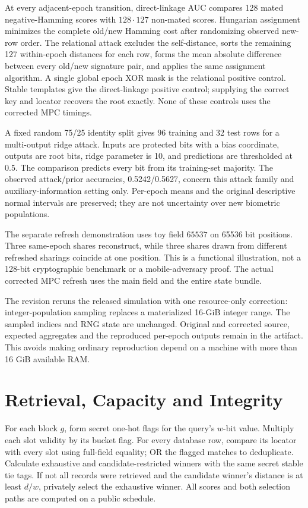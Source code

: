\documentclass[journal,onecolumn]{IEEEtran}
\begin{document}
At every adjacent-epoch transition, direct-linkage AUC compares 128 mated negative-Hamming scores with $128\cdot127$ non-mated scores. Hungarian assignment minimizes the complete old/new Hamming cost after randomizing observed new-row order. The relational attack excludes the self-distance, sorts the remaining 127 within-epoch distances for each row, forms the mean absolute difference between every old/new signature pair, and applies the same assignment algorithm. A single global epoch XOR mask is the relational positive control. Stable templates give the direct-linkage positive control; supplying the correct key and locator recovers the root exactly. None of these controls uses the corrected MPC timings.

A fixed random 75/25 identity split gives 96 training and 32 test rows for a multi-output ridge attack. Inputs are protected bits with a bias coordinate, outputs are root bits, ridge parameter is 10, and predictions are thresholded at 0.5. The comparison predicts every bit from its training-set majority. The observed attack/prior accuracies, 0.5242/0.5627, concern this attack family and auxiliary-information setting only. Per-epoch means and the original descriptive normal intervals are preserved; they are not uncertainty over new biometric populations.

The separate refresh demonstration uses toy field $65537$ on 65536 bit positions. Three same-epoch shares reconstruct, while three shares drawn from different refreshed sharings coincide at one position. This is a functional illustration, not a 128-bit cryptographic benchmark or a mobile-adversary proof. The actual corrected MPC refresh uses the main field and the entire state bundle.

The revision reruns the released simulation with one resource-only correction: integer-population sampling replaces a materialized 16-GiB integer range. The sampled indices and RNG state are unchanged. Original and corrected source, expected aggregates and the reproduced per-epoch outputs remain in the artifact. This avoids making ordinary reproduction depend on a machine with more than 16 GiB available RAM.

\section{Retrieval, Capacity and Integrity}\label{suppsec:supplement:5}
For each block $g$, form secret one-hot flags for the query's $w$-bit value. Multiply each slot validity by its bucket flag. For every database row, compare its locator with every slot using full-field equality; OR the flagged matches to deduplicate. Calculate exhaustive and candidate-restricted winners with the same secret stable tie tags. If not all records were retrieved and the candidate winner's distance is at least $d/w$, privately select the exhaustive winner. All scores and both selection paths are computed on a public schedule.
\end{document}
